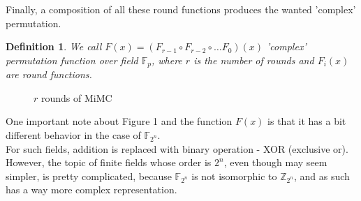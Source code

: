 \documentclass[letterpaper, bothsides, 12pt]{article} %
\newtheorem{definition}{Definition}
\begin{document}
Finally, a composition of all these round functions produces the wanted 'complex' permutation.

\begin{definition}
We call $F(x) = (F_{r-1} \circ F_{r-2} \circ \dots F_0)(x)$ 'complex' permutation function over field $\mathbb{F}_p$, where $r$ is the number of rounds and $F_i(x)$ are round functions. 
\end{definition} 

\begin{figure}[!h]
\centering
{}

\caption{$r$ rounds of MiMC}
\end{figure} 
One important note about Figure 1 and the function $F(x)$ is that it has a bit different behavior in the case of $\mathbb{F}_{2^n}$. \\
For such fields, addition is replaced with binary operation - XOR (exclusive or). However, the topic of finite fields whose order is ${2^n}$, even though may seem simpler, is pretty complicated, because $\mathbb{F}_{2^n}$ is not isomorphic to $\mathbb{Z}_{2^n}$, and as such has a way more complex representation. \\
\end{document}

